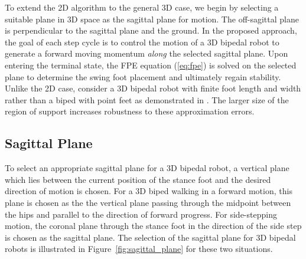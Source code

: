 To extend the 2D algorithm to the general 3D case, we begin by selecting a suitable plane in 3D space as the sagittal plane for motion. The off-sagittal plane is perpendicular to the sagittal plane and the ground.  In the proposed approach, the goal of each step cycle is to control the motion of a 3D bipedal robot to generate a forward moving momentum \emph{along} the selected sagittal plane. Upon entering the terminal state, the FPE equation (\ref{eq:fpe}) is solved on the selected plane to determine the swing foot placement and ultimately regain stability. Unlike the 2D case, consider a 3D bipedal robot with finite foot length and width rather than a biped with point feet as demonstrated in \cite{Wight:2008vt}. The larger size of the region of support increases robustness to these approximation errors. 

\subsection{Sagittal Plane} %
\label{sub:sagittal_plane}
To select an appropriate sagittal plane for a 3D bipedal robot, a vertical plane which lies between the current position of the stance foot and the desired direction of motion is chosen. For a 3D biped walking in a forward motion, this plane is chosen as the the vertical plane passing through the midpoint between the hips and parallel to the direction of forward progress. For side-stepping motion, the coronal plane through the stance foot in the direction of the side step is chosen as the sagittal plane. The selection of the sagittal plane for 3D bipedal robots is illustrated in Figure~\ref{fig:sagittal_plane} for these two situations. 

